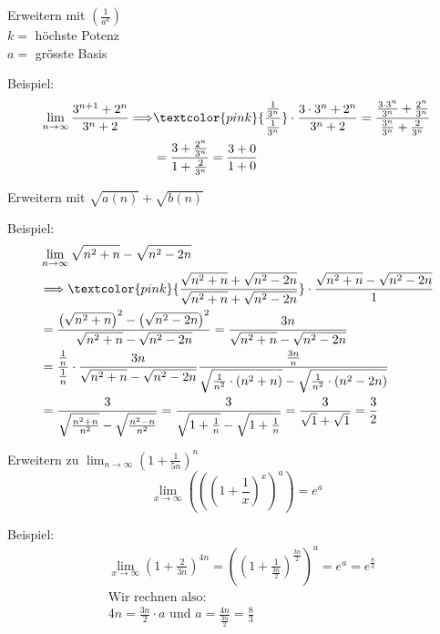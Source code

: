 \begin{KR}{Erweitern mit}
    $\left(\frac{1}{a^k}\right)$\\
$k=$ höchste Potenz \\
$a=$ grösste Basis
\end{KR}
\begin{example}
Beispiel:
    $$
    \begin{aligned}
    \lim _{n \rightarrow \infty} \frac{3^{n+1}+2^n}{3^n+2} \Longrightarrow &  \textcolor{pink}{\frac{\frac{1}{3^n}}{\frac{1}{3^n}}} \cdot \frac{3 \cdot 3^n+2^n}{3^n+2}=\frac{\frac{3 \cdot 3^n}{3^n}+\frac{2^n}{3^n}}{\frac{3^n}{3^n}+\frac{2}{3^n}} \\
    & = \frac{3+\frac{2^n}{3^n}}{1+\frac{2}{3^n}}=\frac{3+0}{1+0}
    \end{aligned}
    $$
\end{example}

\begin{KR}{Erweitern mit}
    $\sqrt{a(n)}+\sqrt{b(n)}$
\end{KR}
\begin{example}
Beispiel:
    $$
    \begin{aligned}
    &\lim _{n \rightarrow \infty} \sqrt{n^{2}+n}-\sqrt{n^{2}-2 n}\\
    &\Longrightarrow \textcolor{pink}{\frac{\sqrt{n^{2}+n}+\sqrt{n^{2}-2 n}}{\sqrt{n^{2}+n}+\sqrt{n^{2}-2 n}}} \cdot \frac{\sqrt{n^{2}+n}-\sqrt{n^{2}-2 n}}{1} \\
    &=\frac{\left(\sqrt{n^{2}+n}\right)^{2}-\left(\sqrt{n^{2}-2 n}\right)^{2}}{\sqrt{n^{2}+n}-\sqrt{n^{2}-2 n}}=\frac{3 n}{\sqrt{n^{2}+n}-\sqrt{n^{2}-2 n}}\\
    &=\frac{\frac{1}{n}}{\frac{1}{n}} \cdot \frac{3 n}{\sqrt{n^{2}+n}-\sqrt{n^{2}-2 n}} \frac{\frac{3 n}{n}}{\sqrt{\frac{1}{n^{2}} \cdot\left(n^{2}+n\right)}-\sqrt{\frac{1}{n^{2}} \cdot\left(n^{2}-2 n\right)}}\\
    &=\frac{3}{\sqrt{\frac{n^{2}+n}{n^{2}}}-\sqrt{\frac{n^{2}-n}{n^{2}}}}=\frac{3}{\sqrt{1+\frac{1}{n}}-\sqrt{1+\frac{1}{n}}}=\frac{3}{\sqrt{1}+\sqrt{1}}=\frac{3}{2}
    \end{aligned}
    $$
\end{example}

\begin{KR}{Erweitern zu}
    $\lim _{n \rightarrow \infty}\left(1+\frac{1}{5 n}\right)^{n}$
    $$
      \lim _{x \rightarrow \infty}\left(\left(\left(1+\frac{1}{x}\right)^{x}\right)^{a}\right)=e^{a}
    $$
\end{KR}
\begin{example}
Beispiel:
    $$
    \begin{aligned}
    &\lim _{x \rightarrow \infty}\left(1+\frac{2}{3 n}\right)^{4 n}
    =\left(\left(1+\frac{1}{\frac{3 n}{2}}\right)^{\frac{3 n}{2}}\right)^{a}=e^{a}=e^{\frac{8}{3}}\\
    &\text{Wir rechnen also:}\\
    & 4 n=\frac{3 n}{2} \cdot a \text{ und } a=\frac{4 n}{\frac{3 n}{2}}=\frac{8}{3}
    \end{aligned}
    $$
\end{example}



   
    


